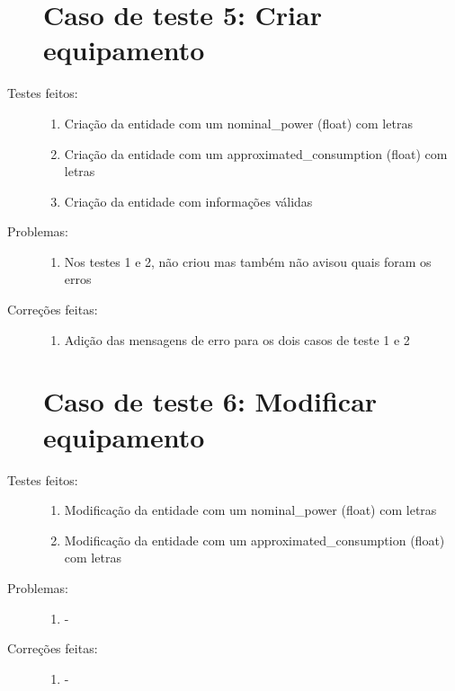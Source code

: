 \begin{description}
  \section{Caso de teste 5: Criar equipamento}
  \item[Testes feitos:]
  \begin{enumerate}
    \item{Criação da entidade com um nominal\_power (float) com letras}
    \item{Criação da entidade com um approximated\_consumption (float) com letras}
    \item{Criação da entidade com informações válidas}
  \end{enumerate}
  \item[Problemas:]
  \begin{enumerate}
    \item{Nos testes 1 e 2, não criou mas também não avisou quais foram os erros}
  \end{enumerate}
  \item[Correções feitas:]
  \begin{enumerate}
    \item{Adição das mensagens de erro para os dois casos de teste 1 e 2}
  \end{enumerate}

  \section{Caso de teste 6: Modificar equipamento}
  \item[Testes feitos:]
  \begin{enumerate}
    \item{Modificação da entidade com um nominal\_power (float) com letras}
    \item{Modificação da entidade com um approximated\_consumption (float) com letras}
  \end{enumerate}
  \item[Problemas:]
  \begin{enumerate}
    \item{-}
  \end{enumerate}
  \item[Correções feitas:]
  \begin{enumerate}
    \item{-}
  \end{enumerate}  


\end{description}
